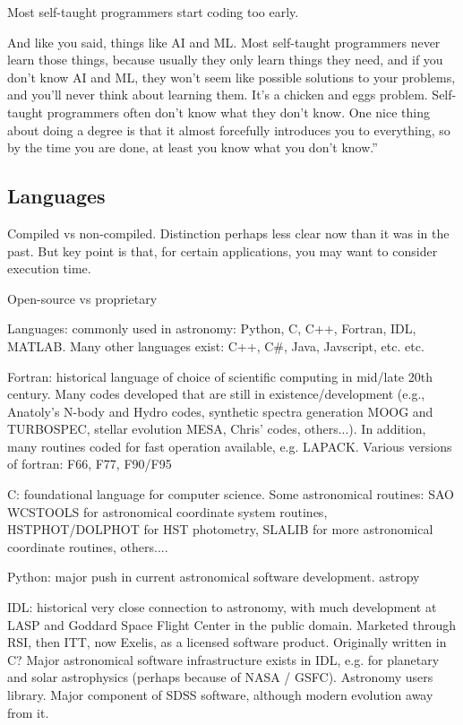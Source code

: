 \documentclass{article}
\begin{document}
Most self-taught programmers start coding too early.

And like you said, things like AI and ML\@. Most self-taught programmers
never learn those things, because usually they only learn things they
need, and if you don't know AI and ML, they won't seem like possible
solutions to your problems, and you'll never think about learning
them. It's a chicken and eggs problem. Self-taught programmers often
don't know what they don't know. One nice thing about doing a degree
is that it almost forcefully introduces you to everything, so by the
time you are done, at least you know what you don't know.''

\subsection{Languages}
Compiled vs non-compiled. Distinction perhaps less clear now than it
was in the past. But key point is that, for certain applications, you
may want to consider execution time.

Open-source vs proprietary

Languages: commonly used in astronomy: Python, C, C++, Fortran, IDL,
MATLAB. Many other languages exist: C++, C\#, Java, Javscript, etc.
etc.

Fortran: historical language of choice of scientific computing in
mid/late 20th century. Many codes developed that are still in
existence/development (e.g., Anatoly's N-body and Hydro codes,
synthetic spectra generation MOOG and TURBOSPEC, stellar evolution
MESA, Chris' codes, others...). In addition, many routines coded for
fast operation available, e.g. LAPACK. Various versions of fortran:
F66, F77, F90/F95

C: foundational language for computer science. Some astronomical
routines: SAO WCSTOOLS for astronomical coordinate system routines,
HSTPHOT/DOLPHOT for HST photometry, SLALIB for more astronomical
coordinate routines, others....

Python: major push in current astronomical software development.
astropy

IDL: historical very close connection to astronomy, with much
development at LASP and Goddard Space Flight Center in the public
domain. Marketed through RSI, then ITT, now Exelis, as a licensed
software product. Originally written in C? Major astronomical software
infrastructure exists in IDL, e.g. for planetary and solar
astrophysics (perhaps because of NASA / GSFC). Astronomy users
library. Major component of SDSS software, although modern evolution
away from it.
\end{document}
